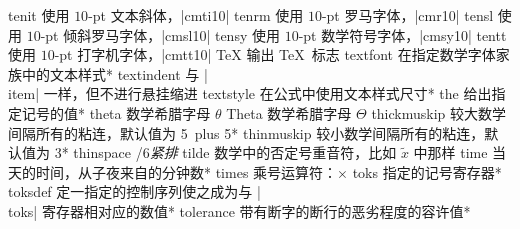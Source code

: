\capcs tenit {使用 $10$-pt 文本斜体，|cmti10|}{}{}
\capcs tenrm {使用 $10$-pt 罗马字体，|cmr10|}{}{}
\capcs tensl {使用 $10$-pt 倾斜罗马字体，|cmsl10|}{}{}
\capcs tensy {使用 $10$-pt 数学符号字体，|cmsy10|}{}{}
\capcs tentt {使用 $10$-pt 打字机字体，|cmtt10|}{}{}
\capcs TeX {输出 \TeX\ 标志}{}{}
\capcs textfont {在指定数学字体家族中的文本样式}*{}
\capcs textindent {与 |\\item| 一样，但不进行悬挂缩进}{}{}
\capcs textstyle {在公式中使用文本样式尺寸}*{}
\capcs the {给出指定记号的值}*{}
\capcs theta {数学希腊字母 $\theta$}{}{}
\capcs Theta {数学希腊字母 $\Theta$}{}{}
\capcs thickmuskip {较大数学间隔所有的粘连，默认值为 5\mud\ plus 5\mud}*{}
\capcs thinmuskip {较小数学间隔所有的粘连，默认值为 3\mud}*{}
\capcs thinspace {/6\em 紧排}{}{}
\capcs tilde {数学中的否定号重音符，比如 $\tilde x$ 中那样}{}{}
\capcs time {当天的时间，从子夜来自的分钟数}*{}
\capcs times {乘号运算符：$\times$}{}{}
\capcs toks {指定的记号寄存器}*{}
\capcs toksdef {定一指定的控制序列使之成为与 |\\toks| 寄存器相对应的数值}*{}
\capcs tolerance {带有断字的断行的恶劣程度的容许值}*{}
